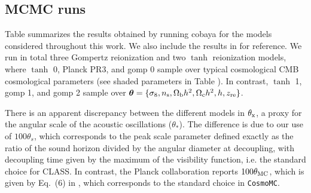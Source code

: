 \subsection*{MCMC runs}
\label{ssec:fits}
Table  summarizes the
results obtained by running cobaya for the models considered throughout this work. We also include 
the results in \cite{Planck2020a} for reference. We run in total three Gompertz reionization and
two $\tanh$ reionization models, where $\tanh$ 0, Planck PR3, and gomp 0 sample over typical cosmological
CMB cosmological parameters (see shaded parameters in Table ). In contrast, 
$\tanh$ 1, gomp 1, and gomp 2  sample over 
$\boldsymbol{\theta} = \{\sigma_8, n_\mathrm{s}, \Omega_\mathrm{b} h^2, \Omega_\mathrm{c} h^2, h, z_{\mathrm{re}}\}$.     

There is an apparent discrepancy between the different models in $\theta_{\rm x}$, 
a proxy for the angular scale of the acoustic oscillations ($\theta_*$). The difference is due to our 
use of $100\theta_s$, which corresponds to the peak scale parameter defined exactly
 as the ratio of the sound horizon divided by the angular diameter at decoupling, with 
 decoupling time given by the maximum of the visibility function, i.e. the standard choice 
 for CLASS. In contrast, the Planck collaboration reports $100\theta_{\rm MC}$, which is given by Eq.~(6) in \cite{Planck2014}, which corresponds to the standard choice in \texttt{CosmoMC}\cite{Lewis2002}.